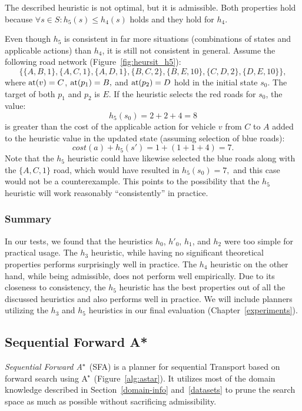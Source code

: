 The described heuristic is not optimal, but it is admissible.
Both properties hold because $\forall s \in S : h_5(s) \leq h_4(s)$ holds
and they hold for $h_4$.

Even though $h_5$ is consistent in far more situations (combinations of states and applicable actions) than $h_4$, it is still not consistent in general.
Assume the following road network (Figure~\ref{fig:heursit_h5}):
$$\{\{A, B, 1\}, \{A, C, 1\}, \{A, D, 1\}, \{B, C, 2\}, \{B, E, 10\}, \{C, D, 2\}, \{D, E, 10\}\},$$
where $\textrm{at}(v) = C$, $\textrm{at}(p_1) = B,$ and $\textrm{at}(p_2) = D$
hold in the initial state $s_0$.
The target of both $p_1$ and $p_2$ is $E$.
If the heuristic selects the red roads for $s_0$, the value:
$$h_5(s_0) = 2+2+4 = 8$$ is greater than the cost
of the applicable \drive{} action for vehicle $v$ from $C$ to $A$
added to the heuristic value in the updated state (assuming selection of blue roads):
$$cost(a) + h_5(s') = 1 + (1+1+4) = 7.$$
Note that the $h_5$ heuristic could have likewise selected the blue roads along
with the $\{A, C, 1\}$ road, which would have resulted in $h_5(s_0) = 7,$
and this case would not be a counterexample. This points to the possibility that the $h_5$ heuristic will work reasonably ``consistently'' in practice.

\subsubsection{Summary}

In our tests, we found that
the heuristics $h_0$, $h'_0$, $h_1$, and $h_2$
were too simple for practical usage.
The $h_3$ heuristic, while having no significant
theoretical properties performs surprisingly well in practice.
The $h_4$ heuristic on the other hand, while being admissible, does not
perform well empirically.
Due to its closeness to consistency, the $h_5$ heuristic has the best properties out of all the discussed heuristics and also
performs well in practice.
We will include planners utilizing the $h_3$ and $h_5$ heuristics
in our final evaluation (Chapter~\ref{experiments}).








\subsection{Sequential Forward A*}\label{sfa}

\textit{Sequential Forward A$^{\kern-.05em*}$} (SFA) is a planner for sequential Transport based on forward search using A$^{\kern-.15em*}$ (Figure~\ref{alg:astar}).
It utilizes most of the domain knowledge described
in Section~\ref{domain-info} and~\ref{datasets}
to prune the search space as much as possible
without sacrificing admissibility.


